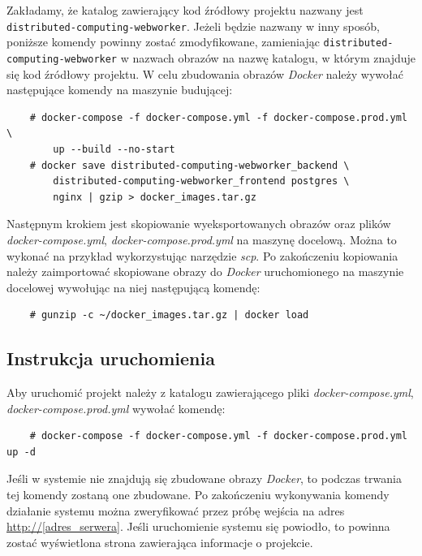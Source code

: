 \documentclass[a4paper,11pt,twoside]{report}
\theoremstyle{definition}
\begin{document}
        Zakładamy, że katalog zawierający kod źródłowy projektu nazwany jest \texttt{distributed-computing-webworker}. Jeżeli będzie nazwany w inny sposób, poniższe komendy powinny zostać zmodyfikowane, zamieniając \texttt{distributed-computing-webworker} w nazwach obrazów na nazwę katalogu, w którym znajduje się kod źródłowy projektu. 
        W celu zbudowania obrazów \textit{Docker} należy wywołać następujące komendy na maszynie budującej:

        \begin{verbatim}
    # docker-compose -f docker-compose.yml -f docker-compose.prod.yml \
        up --build --no-start
    # docker save distributed-computing-webworker_backend \
        distributed-computing-webworker_frontend postgres \
        nginx | gzip > docker_images.tar.gz    
        \end{verbatim}

        Następnym krokiem jest skopiowanie wyeksportowanych obrazów oraz plików \textit{docker-compose.yml}, \textit{docker-compose.prod.yml} na maszynę docelową. Można to wykonać na przykład wykorzystując narzędzie \textit{scp}.
        Po zakończeniu kopiowania należy zaimportować skopiowane obrazy do \textit{Docker} uruchomionego na maszynie docelowej wywołując na niej następującą komendę:

        \begin{verbatim}
    # gunzip -c ~/docker_images.tar.gz | docker load
        \end{verbatim}

    \subsection{Instrukcja uruchomienia}
        \label{start-system}
        Aby uruchomić projekt należy z katalogu zawierającego pliki \textit{docker-compose.yml}, \textit{docker-compose.prod.yml} wywołać komendę:

        \begin{verbatim}
    # docker-compose -f docker-compose.yml -f docker-compose.prod.yml up -d
        \end{verbatim}

        Jeśli w systemie nie znajdują się zbudowane obrazy \textit{Docker}, to podczas trwania tej komendy zostaną one zbudowane.
        Po zakończeniu wykonywania komendy działanie systemu można zweryfikować przez próbę wejścia na adres \url{http://[adres_serwera]}. Jeśli uruchomienie systemu się powiodło, to powinna zostać wyświetlona strona zawierająca informacje o projekcie.
\end{document}
